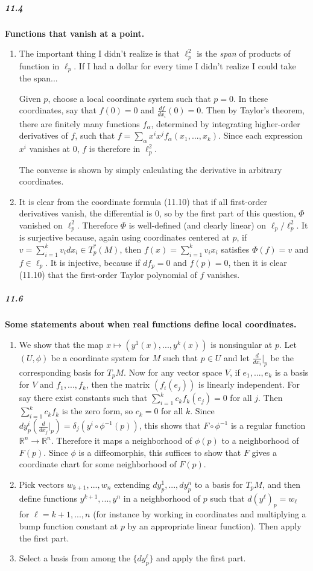 \documentclass[10pt,letter]{article}
\begin{document}
\subparagraph*{11.4} {\bf Functions that vanish at a point.}
\begin{enumerate}
\item The important thing I didn't realize is that $\ell_p^2$ is the {\it span} of products of function in $\ell_p$. If I had a dollar for every time I didn't realize I could take the span...

Given $p$, choose a local coordinate system such that $p = 0$. In these coordinates, say that $f(0) = 0$ and $\frac{df}{dx_i}(0) = 0$. Then by Taylor's theorem, there are finitely many functions $f_{\alpha}$, determined by integrating higher-order derivatives of $f$, such that $f = \sum_{\alpha} x^ix^j f_{\alpha}(x_1,...,x_k)$. Since each expression $x^i$ vanishes at $0$, $f$ is therefore in $\ell_p^2$. 

The converse is shown by simply calculating the derivative in arbitrary coordinates. 
\item It is clear from the coordinate formula (11.10) that if all first-order derivatives vanish, the differential is $0$, so by the first part of this question, $\Phi$ vanished on $\ell_p^2$. Therefore $\Phi$ is well-defined (and clearly linear) on $\ell_p/\ell_p^2$. It is surjective because, again using coordinates centered at $p$, if $v = \sum_{i=1}^k v_i dx_i \in T_p^{\ast}(M)$, then $f(x) = \sum_{i=1}^k v_i x_i$ satisfies $\Phi(f) = v$ and $f \in \ell_p$. It is injective, because if $df_p = 0$ and $f(p) = 0$, then it is clear (11.10) that the first-order Taylor polynomial of $f$ vanishes.
\end{enumerate}
\subparagraph*{11.6} {\bf Some statements about when real functions define local coordinates.}
\begin{enumerate}
\item We show that the map $x \mapsto (y^1(x),...,y^k(x))$ is nonsingular at $p$. Let $(U,\phi)$ be a coordinate system for $M$ such that $p \in U$ and let $\frac{d}{dx_i}\vert_p$ be the corresponding basis for $T_pM$. Now for any vector space $V$, if $e_1,...,e_k$ is a basis for $V$ and $f_1,...,f_k$, then the matrix $(f_i(e_j))$ is linearly independent. For say there exist constants such that $\sum_{i=1}^k c_k f_k(e_j) = 0$ for all $j$. Then $\sum_{i=1}^k c_k f_k$ is the zero form, so $c_k = 0$ for all $k$. Since $dy^i_p(\frac{d}{dx_j}\vert_p) = \delta_j (y^i \circ \phi^{-1}(p))$, this shows that $F \circ \phi^{-1}$ is a regular function $\mathbb{R}^n \rightarrow \mathbb{R}^n$. Therefore it maps a neighborhood of $\phi(p)$ to a neighborhood of $F(p)$. Since $\phi$ is a diffeomorphis, this suffices to show that $F$ gives a coordinate chart for some neighborhood of $F(p)$. 
\item Pick vectors $w_{k+1},...,w_n$ extending $dy^1_p,...,dy^n_p$ to a basis for $T_pM$, and then define functions $y^{k+1},...,y^n$ in a neighborhood of $p$ such that $d(y^\ell)_p = w_\ell$ for $\ell = k+1,...,n$ (for instance by working in coordinates and multiplying a bump function constant at $p$ by an appropriate linear function). Then apply the first part.
\item Select a basis from among the $\lbrace dy^\ell_p \rbrace$ and apply the first part. 
\end{enumerate}
\end{document}
